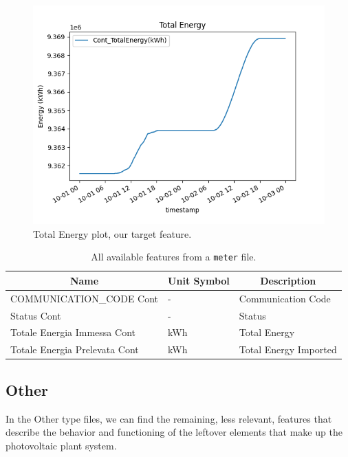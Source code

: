 \begin{figure}[H]
	\centering
	\includegraphics[width=1\linewidth]{chapters/1_introduction/imgs/totalenergy.png}
	\caption{Total Energy plot, our target feature.}
	\label{fig:totenergyplot}
\end{figure}

\begin{table}[H]
	\begin{center}
		\begin{tabular}[c]{l|l|l}
			\hline
			\multicolumn{1}{c|}{\textbf{Name}}        &
			\multicolumn{1}{c|}{\textbf{Unit Symbol}} &
			\multicolumn{1}{c}{\textbf{Description}}                                \\
			\hline
			COMMUNICATION\_CODE Cont                  & -   & Communication Code    \\
			Status Cont                               & -   & Status                \\
			Totale Energia Immessa Cont               & kWh & Total Energy          \\
			Totale Energia Prelevata Cont             & kWh & Total Energy Imported \\
			\hline
		\end{tabular}
		\caption{All available features from a \texttt{meter} file.}\label{tab:meterfeatures}
	\end{center}
\end{table}

\subsection{Other}
In the Other type files, we can find the remaining,
less relevant, features
that describe the behavior and functioning of the leftover elements
that make up the photovoltaic plant system.

